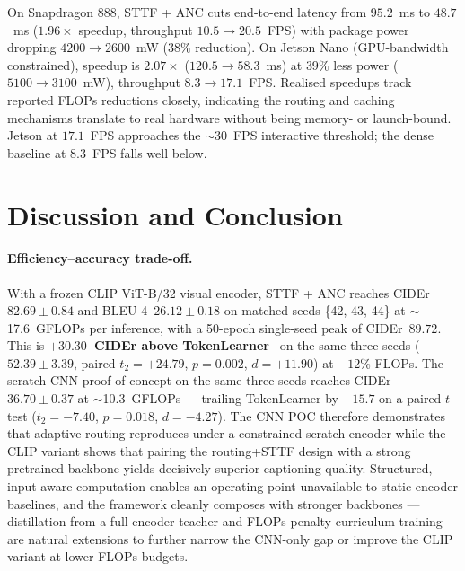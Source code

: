 \documentclass{article}
\begin{document}
On Snapdragon 888, STTF + ANC cuts end-to-end latency from $95.2$~ms to $48.7$~ms ($1.96\times$ speedup, throughput $10.5{\to}20.5$~FPS) with package power dropping $4200{\to}2600$~mW ($38\%$ reduction). On Jetson Nano (GPU-bandwidth constrained), speedup is $2.07\times$ ($120.5{\to}58.3$~ms) at $39\%$ less power ($5100{\to}3100$~mW), throughput $8.3{\to}17.1$~FPS. Realised speedups track reported FLOPs reductions closely, indicating the routing and caching mechanisms translate to real hardware without being memory- or launch-bound. Jetson at $17.1$~FPS approaches the $\sim$30~FPS interactive threshold; the dense baseline at $8.3$~FPS falls well below.

\section{Discussion and Conclusion}

\paragraph{Efficiency--accuracy trade-off.}
With a frozen CLIP ViT-B/32 visual encoder, STTF + ANC reaches CIDEr~$\mathbf{82.69 \pm 0.84}$ and BLEU-4~$\mathbf{26.12 \pm 0.18}$ on matched seeds \{42, 43, 44\} at $\sim$17.6~GFLOPs per inference, with a 50-epoch single-seed peak of CIDEr~$89.72$. This is \textbf{$+30.30$~CIDEr above TokenLearner}~\cite{ryoo2021tokenlearner} on the same three seeds ($52.39 \pm 3.39$, paired $t_{2}{=}{+}24.79$, $p{=}0.002$, $d{=}{+}11.90$) at $-12\%$ FLOPs. The scratch CNN proof-of-concept on the same three seeds reaches CIDEr $36.70 \pm 0.37$ at $\sim$10.3~GFLOPs — trailing TokenLearner by $-15.7$ on a paired $t$-test ($t_{2}{=}{-}7.40$, $p{=}0.018$, $d{=}{-}4.27$). The CNN POC therefore demonstrates that adaptive routing reproduces under a constrained scratch encoder while the CLIP variant shows that pairing the routing+STTF design with a strong pretrained backbone yields decisively superior captioning quality. Structured, input-aware computation enables an operating point unavailable to static-encoder baselines, and the framework cleanly composes with stronger backbones — distillation from a full-encoder teacher and FLOPs-penalty curriculum training are natural extensions to further narrow the CNN-only gap or improve the CLIP variant at lower FLOPs budgets.
\end{document}
